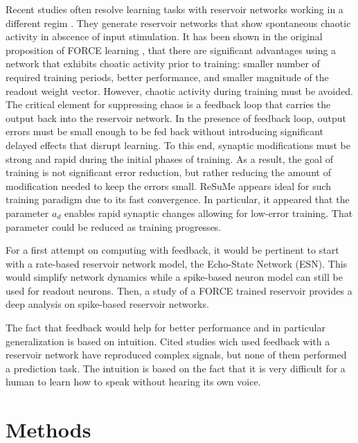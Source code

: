 \documentclass[11pt, a4paper]{article} %
\begin{document}
Recent studies often resolve learning tasks with reservoir networks working in a different regim \cite{jaeger2004harnessing, sussillo2009generating, nicola2016supervised}. They generate reservoir networks that show spontaneous chaotic activity in abscence of input stimulation. It has been shown in the original proposition of FORCE learning \cite{sussillo2009generating}, that there are significant advantages using a network that exhibits choatic activity prior to training: smaller number of required training periods, better performance, and smaller magnitude of the readout weight vector. However, chaotic activity during training must be avoided. The critical element for suppressing chaos is a feedback loop that carries the output back into the reservoir network. In the presence of feedback loop, output errors must be small enough to be fed back without introducing significant delayed effects that disrupt learning. To this end, synaptic modifications must be strong and rapid during the initial phases of training. As a result, the goal of training is not significant error reduction, but rather reducing the amount of modification needed to keep the errors small. ReSuMe appears ideal for such training paradigm due to its fast convergence. In particular, it appeared that the parameter $a_d$ enables rapid synaptic changes allowing for low-error training. That parameter could be reduced as training progresses.

For a first attempt on computing with feedback, it would be pertinent to start with a rate-based reservoir network model, the Echo-State Network (ESN). This would simplify network dynamics while a spike-based neuron model can still be used for readout neurons. Then, a study of a FORCE trained reservoir \cite{nicola2016supervised} provides a deep analysis on spike-based reservoir networks.

The fact that feedback would help for better performance and in particular generalization is based on intuition. Cited studies wich used feedback with a reservoir network have reproduced complex signals, but none of them performed a prediction task. The intuition is based on the fact that it is very difficult for a human to learn how to speak without hearing its own voice.

\section{Methods \label{methods}}
\end{document}
